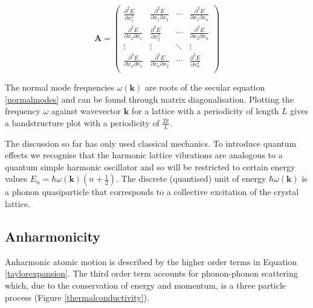 \begin{equation} \label{forceconstant}
\textbf{A} = 
\begin{pmatrix} 
\frac{\partial^2E}{\partial x_1^2} &\frac{\partial^2E}{\partial x_1 \partial x_2} & \cdots & \frac{\partial^2E}{\partial x_1 \partial x_n}\\
\frac{\partial^2E}{\partial x_2 \partial x_1}&\frac{\partial^2E}{\partial x_2^2} & \cdots & \frac{\partial^2E}{\partial x_2 \partial x_n}\\
\vdots & \vdots & \ddots & \vdots \\
\frac{\partial^2E}{\partial x_n \partial x_1}&\frac{\partial^2E}{\partial x_n \partial x_2} & \cdots & \frac{\partial^2E}{\partial x_n^2}\\
\end{pmatrix}
\end{equation}

The normal mode frequencies $\omega(\textbf{k})$ are roots of the secular equation \ref{normalmodes} and can be found through matrix diagonalisation. Plotting the frequency $\omega$ against wavevector $\textbf{k}$ for a lattice with a periodicity of length $L$ gives a bandstructure plot with a periodicity of $\frac{2\pi}{L}$.   %

The discussion so far has only used classical mechanics. To introduce quantum effects we recognise that the harmonic lattice vibrations are analogous to a quantum simple harmonic oscillator and so will be restricted to certain energy values $E_n = \hbar\omega(\textbf{k})(n+\frac{1}{2})$.
The discrete (quantised) unit of energy $\hbar\omega(\textbf{k})$ is a phonon quasiparticle that corresponds to a collective excitation of the crystal lattice.

\subsection{Anharmonicity} \label{anharmonicapprox}

Anharmonic atomic motion is described by the higher order terms in Equation \ref{taylorexpansion}.
The third order term accounts for phonon-phonon scattering which, due to the conservation of energy and momentum, is a three particle process (Figure \ref{thermalconductivity}).\autocite{Lundstrom2000}

